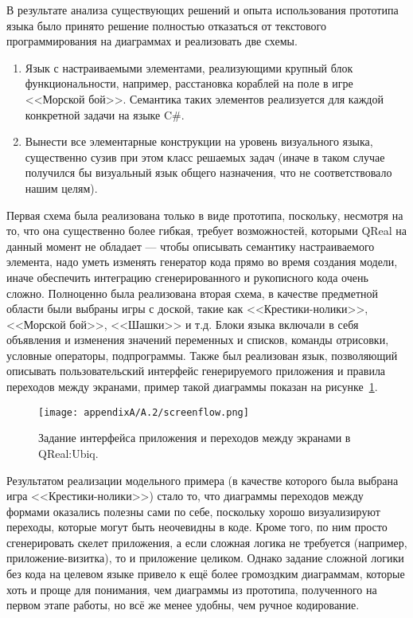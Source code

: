 В результате анализа существующих решений и опыта использования прототипа языка было 
принято решение полностью отказаться от текстового программирования на диаграммах и реализовать две схемы.
\begin{enumerate}
	\item Язык с настраиваемыми элементами, реализующими крупный блок функциональности, 
		например, расстановка кораблей на поле в игре <<Морской бой>>. Семантика таких 
		элементов реализуется для каждой конкретной задачи на языке C\#.
	\item Вынести все элементарные конструкции на уровень визуального языка, существенно 
		сузив при этом класс решаемых задач (иначе в таком случае получился бы визуальный 
		язык общего назначения, что не соответствовало нашим целям). 
\end{enumerate}

Первая схема была реализована только в виде прототипа, поскольку, несмотря на то, 
что она существенно более гибкая, требует возможностей, которыми QReal на данный момент 
не обладает --- чтобы описывать семантику настраиваемого элемента, надо уметь изменять 
генератор кода прямо во время создания модели, иначе обеспечить интеграцию сгенерированного 
и рукописного кода очень сложно. Полноценно была реализована вторая схема, в качестве 
предметной области были выбраны игры с доской, такие как <<Крестики-нолики>>, <<Морской бой>>, 
<<Шашки>> и т.д. Блоки языка включали в себя объявления и изменения значений переменных 
и списков, команды отрисовки, условные операторы, подпрограммы. Также был реализован 
язык, позволяющий описывать пользовательский интерфейс генерируемого приложения и правила 
переходов между экранами, пример такой диаграммы показан на рисунке~\ref{image:screenflow}.

\begin{figure} [ht]
	\begin{center}
		\texttt{[image: appendixA/A.2/screenflow.png]}
		\caption{Задание интерфейса приложения и переходов между экранами в QReal:Ubiq.}
		\label{image:screenflow}
	\end{center}
\end{figure}

Результатом реализации модельного примера (в качестве которого была выбрана игра <<Крестики-нолики>>) 
стало то, что диаграммы переходов между формами оказались полезны сами по себе, поскольку 
хорошо визуализируют переходы, которые могут быть неочевидны в коде. Кроме того, по 
ним просто сгенерировать скелет приложения, а если сложная логика не требуется (например, 
приложение-визитка), то и приложение целиком. Однако задание сложной логики без кода 
на целевом языке привело к ещё более громоздким диаграммам, которые хоть и проще для 
понимания, чем диаграммы из прототипа, полученного на первом этапе работы, но всё 
же менее удобны, чем ручное кодирование.

